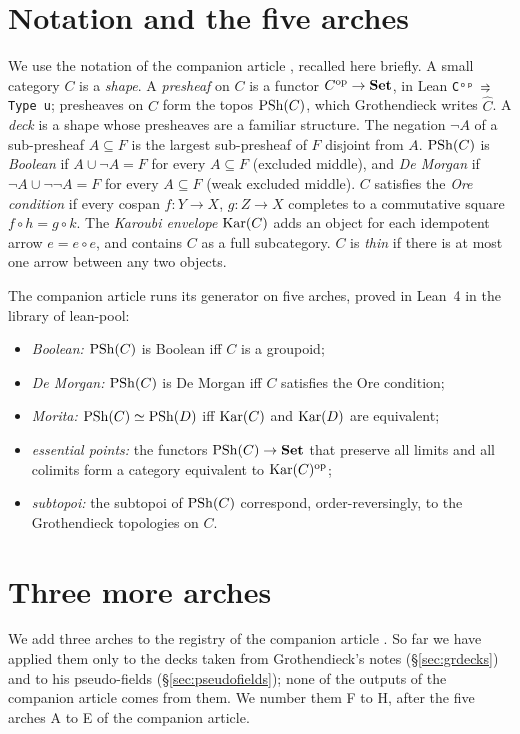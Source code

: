 \section{Notation and the five arches}\label{sec:recall}

We use the notation of the companion article \cite{bridges-generator}, recalled here briefly. A small category $C$ is a \emph{shape}. A \emph{presheaf} on $C$ is a functor $C^{\mathrm{op}}\to\mathbf{Set}$, in Lean \texttt{Cᵒᵖ ⥤ Type u}; presheaves on $C$ form the topos $\mathrm{PSh}(C)$, which Grothendieck writes $\widehat C$. A \emph{deck} is a shape whose presheaves are a familiar structure. The negation $\neg A$ of a sub-presheaf $A\subseteq F$ is the largest sub-presheaf of $F$ disjoint from $A$. $\mathrm{PSh}(C)$ is \emph{Boolean} if $A\cup\neg A = F$ for every $A\subseteq F$ (excluded middle), and \emph{De Morgan} if $\neg A\cup\neg\neg A = F$ for every $A\subseteq F$ (weak excluded middle). $C$ satisfies the \emph{Ore condition} if every cospan $f : Y\to X$, $g : Z\to X$ completes to a commutative square $f\circ h = g\circ k$. The \emph{Karoubi envelope} $\operatorname{Kar}(C)$ adds an object for each idempotent arrow $e = e\circ e$, and contains $C$ as a full subcategory. $C$ is \emph{thin} if there is at most one arrow between any two objects.

The companion article runs its generator on five arches, proved in Lean~4 in the library \lp{} of lean-pool:
\begin{itemize}
\item \emph{Boolean:} $\mathrm{PSh}(C)$ is Boolean iff $C$ is a groupoid;
\item \emph{De Morgan:} $\mathrm{PSh}(C)$ is De Morgan iff $C$ satisfies the Ore condition;
\item \emph{Morita:} $\mathrm{PSh}(C)\simeq\mathrm{PSh}(D)$ iff $\operatorname{Kar}(C)$ and $\operatorname{Kar}(D)$ are equivalent;
\item \emph{essential points:} the functors $\mathrm{PSh}(C)\to\mathbf{Set}$ that preserve all limits and all colimits form a category equivalent to $\operatorname{Kar}(C)^{\mathrm{op}}$;
\item \emph{subtopoi:} the subtopoi of $\mathrm{PSh}(C)$ correspond, order-reversingly, to the Grothendieck topologies on $C$.
\end{itemize}

\section{Three more arches}\label{sec:morearches}

We add three arches to the registry of the companion article \cite{bridges-generator}. So far we have applied them only to the decks taken from Grothendieck's notes (\S\ref{sec:grdecks}) and to his pseudo-fields (\S\ref{sec:pseudofields}); none of the outputs of the companion article comes from them. We number them F to H, after the five arches A to E of the companion article.
\setcounter{bridge}{5}

